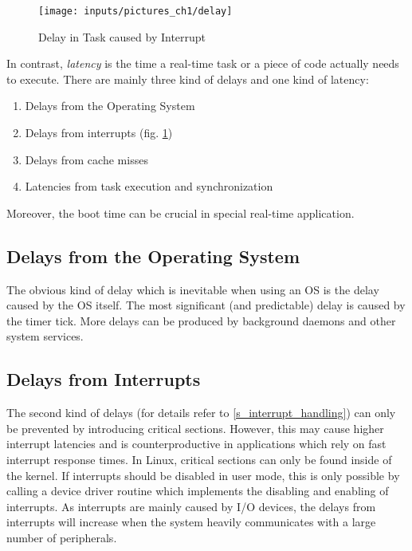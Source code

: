 \begin{figure}[htb]
	\begin{center}
		\texttt{[image: inputs/pictures\_ch1/delay]}
	\end{center}
	\caption[Delay in Task caused by Interrupt]{Delay in Task caused by Interrupt} \label{fig_delay}
\end{figure}

In contrast, \textit{latency} is the time a real-time task or a piece of code actually needs to execute. 
There are mainly three kind of delays and one kind of latency:
\begin{enumerate}
	\item Delays from the Operating System
	\item Delays from interrupts (fig. \ref{fig_delay})
	\item Delays from cache misses
	\item Latencies from task execution and synchronization
\end{enumerate}
Moreover, the boot time can be crucial in special real-time application.

\subsection{Delays from the Operating System}
The obvious kind of delay which is inevitable when using an \ac{OS} is the delay caused by the \ac{OS} itself.
The most significant (and predictable) delay is caused by the timer tick.
More delays can be produced by background daemons and other system services. 

\subsection{Delays from Interrupts}
The second kind of delays (for details refer to \ref{s_interrupt_handling}) can only be prevented by introducing critical sections. 
However, this may cause higher interrupt latencies and is counterproductive in applications which rely on fast interrupt response times.
In Linux, critical sections can only be found inside of the kernel.
If interrupts should be disabled in user mode, this is only possible by calling a device driver routine which implements the disabling and enabling of interrupts.  
As interrupts are mainly caused by \ac{I/O} devices, the delays from interrupts will increase when the system heavily communicates with a large number of peripherals. 

